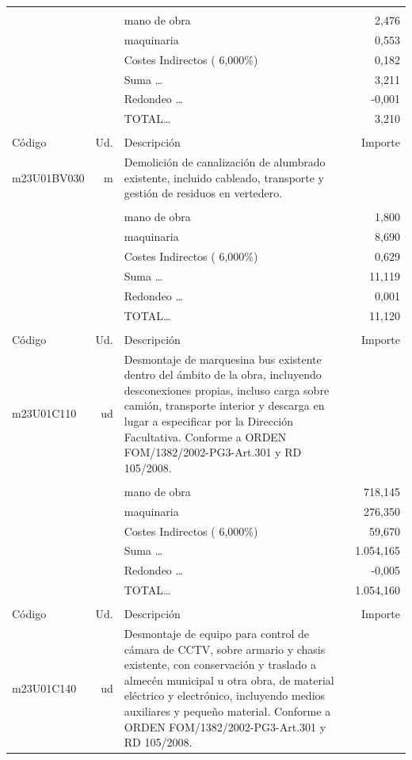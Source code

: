 \begin{supertabular}{l r p{60mm} r}
&&&\\%
&&mano de obra&     2,476\\%
&&maquinaria&     0,553\\%
&&Costes Indirectos (     6,000\%)&     0,182\\%
&&Suma \ldots&     3,211\\%
&&Redondeo \ldots&    {-}0,001\\%
%
&&TOTAL\ldots&     3,210\\%
&&&\\%
Código&Ud.&Descripción&Importe\\%
\hline%
m23U01BV030&m&Demolición de canalización de alumbrado existente, incluido cableado, transporte y gestión de residuos en vertedero.&\\%
&&&\\%
&&mano de obra&     1,800\\%
&&maquinaria&     8,690\\%
&&Costes Indirectos (     6,000\%)&     0,629\\%
&&Suma \ldots&    11,119\\%
&&Redondeo \ldots&     0,001\\%
%
&&TOTAL\ldots&    11,120\\%
&&&\\%
Código&Ud.&Descripción&Importe\\%
\hline%
m23U01C110&ud&Desmontaje de marquesina bus existente dentro del ámbito de la obra, incluyendo desconexiones propias, incluso carga sobre camión, transporte interior y descarga en lugar a especificar por la Dirección Facultativa. Conforme a ORDEN FOM/1382/2002{-}PG3{-}Art.301 y RD 105/2008.&\\%
&&&\\%
&&mano de obra&   718,145\\%
&&maquinaria&   276,350\\%
&&Costes Indirectos (     6,000\%)&    59,670\\%
&&Suma \ldots& 1.054,165\\%
&&Redondeo \ldots&    {-}0,005\\%
%
&&TOTAL\ldots& 1.054,160\\%
&&&\\%
Código&Ud.&Descripción&Importe\\%
\hline%
m23U01C140&ud&Desmontaje de equipo para control de cámara de CCTV, sobre armario y chasis existente, con conservación y traslado a almecén municipal u otra obra, de material eléctrico y electrónico, incluyendo medios auxiliares y pequeño material. Conforme a ORDEN FOM/1382/2002{-}PG3{-}Art.301 y RD 105/2008.&\\%

\end{supertabular}
